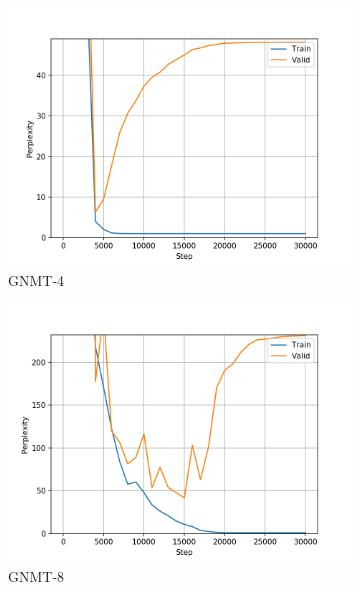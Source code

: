 \begin{figure}[h]
\begin{subfigure}{0.3\textwidth}
\includegraphics[width=\textwidth]{../results/lc-quad1/run1/wmt16_gnmt_4_layer/ppls.png} 
\caption{GNMT-4}
\label{fig:lcquad gnmt4 ppl}
\end{subfigure}
\hfill
\begin{subfigure}{0.3\textwidth}
\includegraphics[width=\textwidth]{../results/lc-quad1/run1/wmt16_gnmt_8_layer/ppls.png}
\caption{GNMT-8}
\label{fig:lcquad gnmt8 ppl}
\end{subfigure}
\hfill
\begin{subfigure}{0.3\textwidth}

\end{subfigure}
\end{figure}
